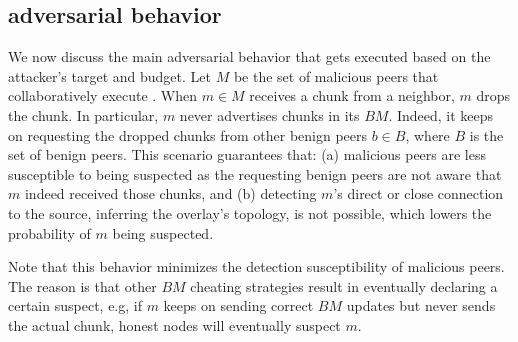 \subsection{\drop adversarial behavior}
We now discuss the main adversarial behavior that gets executed based on the attacker's target and budget. 
Let $M$ be the set of malicious peers that collaboratively execute \drop. 
When $m \in M$ receives a chunk from a neighbor, $m$ drops the chunk.
In particular, $m$ never advertises chunks in its $BM$.
Indeed, it keeps on requesting the dropped chunks from other benign peers $b \in B$, where $B$ is the set of benign peers.
This scenario guarantees that: (a) malicious peers are less susceptible to being suspected as the requesting benign peers are not aware that $m$ indeed received those chunks,
and (b) detecting $m$'s direct or close connection to the source, inferring the overlay's topology, is not possible, which lowers the probability of $m$ being suspected.


Note that this behavior minimizes the detection susceptibility of malicious peers.
The reason is that other $BM$ cheating strategies result in eventually declaring a certain suspect, e.g, if $m$ keeps on sending correct $BM$ updates but never sends the actual chunk, honest nodes will eventually suspect $m$.


 





